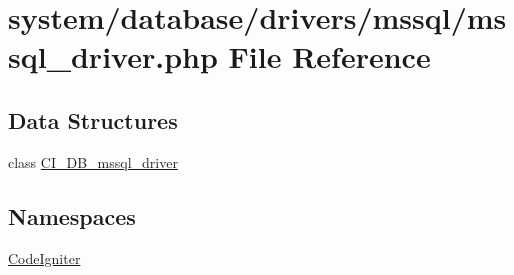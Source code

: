 \hypertarget{mssql__driver_8php}{}\section{system/database/drivers/mssql/mssql\+\_\+driver.php File Reference}
\label{mssql__driver_8php}
\subsection*{Data Structures}
\begin{DoxyCompactItemize}
\item 
class \mbox{\hyperlink{class_c_i___d_b__mssql__driver}{C\+I\+\_\+\+D\+B\+\_\+mssql\+\_\+driver}}
\end{DoxyCompactItemize}
\subsection*{Namespaces}
\begin{DoxyCompactItemize}
\item 
 \mbox{\hyperlink{namespace_code_igniter}{Code\+Igniter}}
\end{DoxyCompactItemize}
